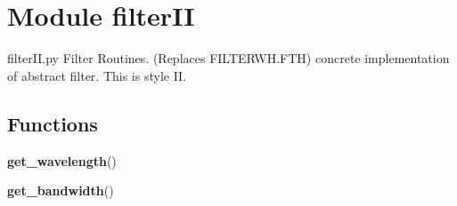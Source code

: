 %
%
%


\section{Module filterII}

    \label{filterII}
filterII.py        Filter Routines. (Replaces FILTERWH.FTH) concrete 
implementation of abstract filter. This is style II.



  \subsection{Functions}

    \label{filterII:get_wavelength}

    \vspace{0.5ex}

    \begin{boxedminipage}{\textwidth}

    \raggedright \textbf{get\_wavelength}()

    \end{boxedminipage}

    \label{filterII:get_bandwidth}

    \vspace{0.5ex}

    \begin{boxedminipage}{\textwidth}

    \raggedright \textbf{get\_bandwidth}()

    \end{boxedminipage}

    \label{filterII:get_filtername}


